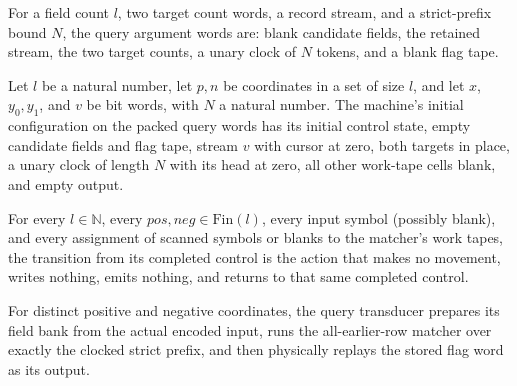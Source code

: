 \begin{definition}
\label{Complexity.clQueryWords}
\leanok
For a field count $l$, two target count words, a record stream, and a strict-prefix bound $N$, the query argument words are: blank candidate fields, the retained stream, the two target counts, a unary clock of $N$ tokens, and a blank flag tape.
\end{definition}

\begin{lemma}
\label{Complexity.clQuery_initial}
\leanok
{}
Let $l$ be a natural number, let $p,n$ be coordinates in a set of size $l$, and let $x$,
$y_0,y_1$, and $v$ be bit words, with $N$ a natural number. The machine's initial
configuration on the packed query words has its initial control state, empty candidate
fields and flag tape, stream $v$ with cursor at zero, both targets in place, a unary
clock of length $N$ with its head at zero, all other work-tape cells blank, and empty
output.
\end{lemma}

\begin{lemma}
\label{Complexity.clMatch_return}
\leanok
{}
For every $l\in\mathbb{N}$, every $pos,neg\in\text{Fin}(l)$, every input symbol
(possibly blank), and every assignment of scanned symbols or blanks to the matcher’s
work tapes, the transition from its completed control is the action that makes no
movement, writes nothing, emits nothing, and returns to that same completed control.
\end{lemma}

\begin{definition}
\label{Complexity.clQueryFlagsTM}
\leanok
{}
For distinct positive and negative coordinates, the query transducer prepares its field bank from the actual encoded input, runs the all-earlier-row matcher over exactly the clocked strict prefix, and then physically replays the stored flag word as its output.
\end{definition}


